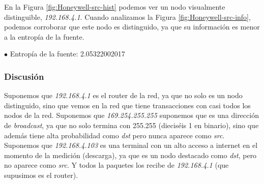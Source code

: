 En la Figura \ref{fig:Honeywell-src-hist} podemos ver un nodo visualmente distinguible, \emph{192.168.4.1}.
Cuando analizamos la Figura \ref{fig:Honeywell-src-info}, podemos corroborar que este nodo es distinguido, ya que su información es menor a la entropía de la fuente.

$\bullet$ Entropía de la fuente: 2.05322002017

\subsubsection{Discusión}

Suponemos que \emph{192.168.4.1} es el router de la red, ya que no solo es un nodo distinguido, sino que vemos en la red que tiene transacciones con casi todos los nodos de la red.
Suponemos que \emph{169.254.255.255} suponemos que es una dirección de \emph{broadcast}, ya que no solo termina con 255.255 (dieciséis 1 en binario), sino que además tiene alta probabilidad como \emph{dst} pero nunca aparece como \emph{src}.
Suponemos que \emph{192.168.4.103} es una terminal con un alto acceso a internet en el momento de la medición (descarga), ya que es un nodo destacado como \emph{dst}, pero no aparece como \emph{src}. Y todos la paquetes los recibe de \emph{192.168.4.1} (que supusimos es el router). 
